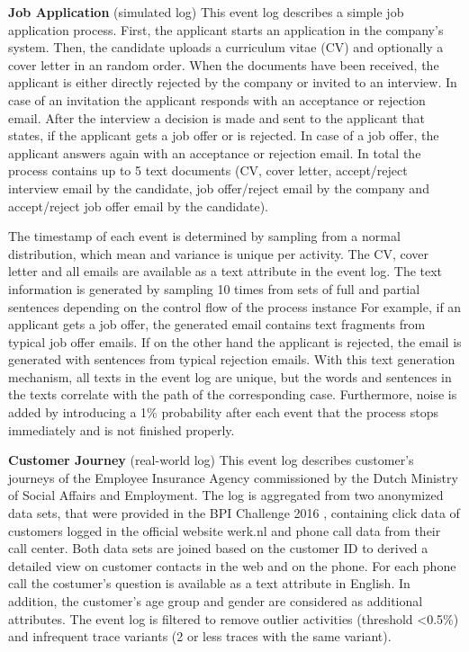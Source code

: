 \textbf{Job Application} (simulated log) This event log describes a simple job application process. 
First, the applicant starts an application in the company's system.
Then, the candidate uploads a curriculum vitae (CV) and optionally a cover letter in an random order.
When the documents have been received, the applicant is either directly rejected by the company or invited to an interview.
In case of an invitation the applicant responds with an acceptance or rejection email.
After the interview a decision is made and sent to the applicant that states, if the applicant gets a job offer or is rejected.
In case of a job offer, the applicant answers again with an acceptance or rejection email.
In total the process contains up to 5 text documents (CV, cover letter, accept/reject interview email by the candidate, job offer/reject email by the company and accept/reject job offer email by the candidate).

The timestamp of each event is determined by sampling from a normal distribution, which mean and variance is unique per activity.
The CV, cover letter and all emails are available as a text attribute in the event log.
The text information is generated by sampling 10 times from sets of full and partial sentences depending on the control flow of the process instance
For example, if an applicant gets a job offer, the generated email contains text fragments from typical job offer emails.
If on the other hand the applicant is rejected, the email is generated with sentences from typical rejection emails.
With this text generation mechanism, all texts in the event log are unique, but the words and sentences in the texts correlate with the path of the corresponding case.
Furthermore, noise is added by introducing a 1\% probability after each event that the process stops immediately and is not finished properly.

\textbf{Customer Journey} (real-world log) This event log describes customer's journeys of the Employee Insurance Agency commissioned by the Dutch Ministry of Social Affairs and Employment.
The log is aggregated from two anonymized data sets, that were provided in the BPI Challenge 2016 \cite{bpichallenge2016}, containing click data of customers logged in the official website werk.nl and phone call data from their call center.
Both data sets are joined based on the customer ID to derived a detailed view on customer contacts in the web and on the phone.
For each phone call the costumer's question is available as a text attribute in English.
In addition, the customer's age group and gender are considered as additional attributes.
The event log is filtered to remove outlier activities (threshold <0.5\%) and infrequent trace variants (2 or less traces with the same variant).
 
